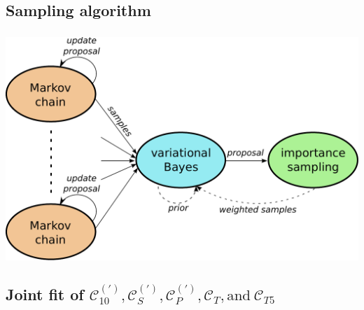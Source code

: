 \documentclass[english]{beamer}
\newcommand{\slide}[2][t]{\begin{frame}[#1] \frametitle{\insertsubsectionhead} #2 \end{frame}}
\begin{document}
\subsection{Sampling algorithm}

\slide{

    \includegraphics[width=\textwidth]{figures/algorithm}

}

\subsection{Joint fit of $\mathcal{C}_{10} ^{(\prime)} , \mathcal{C}_S ^{(\prime)} , \mathcal{C}_P ^{(\prime)} , \mathcal{C}_T , \text{and} ~ \mathcal{C}_{T5}$ }
\end{document}
